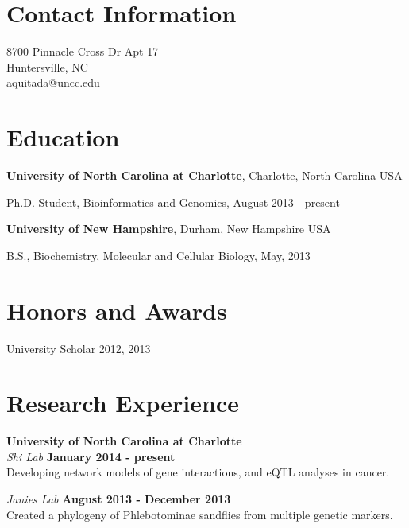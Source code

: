 \documentclass[margin,line]{res}
\newenvironment{list1}{
  \begin{list}{\ding{113}}{%
      \setlength{\itemsep}{0in}
      \setlength{\parsep}{0in} \setlength{\parskip}{0in}
      \setlength{\topsep}{0in} \setlength{\partopsep}{0in} 
      \setlength{\leftmargin}{0.17in}}}{\end{list}}
\begin{document}

\begin{resume}
\section{\sc Contact Information}
\vspace{.05in}
8700 Pinnacle Cross Dr Apt 17  \\                    
Huntersville, NC \\
aquitada@uncc.edu\\       


\section{\sc Education}
{\bf University of North Carolina at Charlotte}, Charlotte, North Carolina USA\\

\vspace*{-.1in}
\begin{list1}
\item[] Ph.D. Student, Bioinformatics and Genomics, August 2013 - present
\end{list1}


{\bf University of New Hampshire}, Durham, New Hampshire USA\\ 
\vspace*{-.1in}
\begin{list1}
\item[] B.S., Biochemistry, Molecular and Cellular Biology,  May, 2013
\end{list1}


\section{\sc Honors and Awards} 
University Scholar 2012, 2013


\section{\sc Research Experience}
{\bf University of North Carolina at Charlotte}\\
{\em Shi Lab} \hfill {\bf January 2014 - present}\\
Developing network models of gene interactions, and eQTL analyses in cancer.

{\em Janies Lab} \hfill {\bf August 2013 - December 2013}\\
Created a phylogeny of Phlebotominae sandflies from multiple genetic markers.    
\hspace*{.05in} 


\end{resume}
\end{document}
